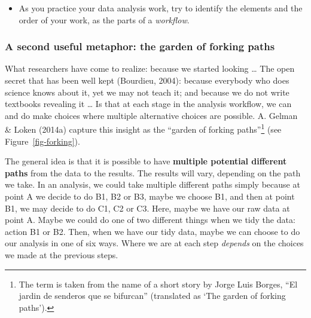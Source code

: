 \documentclass[
  letterpaper,
  DIV=11,
  numbers=noendperiod]{scrreprt}
\providecommand{\tightlist}{%
  \setlength{\itemsep}{0pt}\setlength{\parskip}{0pt}}\usepackage{longtable,booktabs,array}
\begin{document}
\begin{tcolorbox}[enhanced jigsaw, opacitybacktitle=0.6, title=\textcolor{quarto-callout-tip-color}{\faLightbulb}\hspace{0.5em}{Tip}, arc=.35mm, colbacktitle=quarto-callout-tip-color!10!white, colframe=quarto-callout-tip-color-frame, leftrule=.75mm, opacityback=0, breakable, titlerule=0mm, left=2mm, bottomrule=.15mm, toprule=.15mm, colback=white, coltitle=black, bottomtitle=1mm, toptitle=1mm, rightrule=.15mm]

\begin{itemize}
\tightlist
\item
  As you practice your data analysis work, try to identify the elements
  and the order of your work, as the parts of a \emph{workflow}.
\end{itemize}

\end{tcolorbox}

\hypertarget{sec-forking}{%
\subsubsection{A second useful metaphor: the garden of forking
paths}\label{sec-forking}}

What researchers have come to realize: because we started looking
\ldots{} The open secret that has been well kept (Bourdieu, 2004):
because everybody who does science knows about it, yet we may not teach
it; and because we do not write textbooks revealing it \ldots{} Is that
at each stage in the analysis workflow, we can and do make choices where
multiple alternative choices are possible. A. Gelman \& Loken (2014a)
capture this insight as the ``garden of forking paths''\footnote{The
  term is taken from the name of a short story by Jorge Luis Borges,
  ``El jardin de senderos que se bifurcan'' (translated as `The garden
  of forking paths').} (see Figure~\ref{fig-forking}).

The general idea is that it is possible to have \textbf{multiple
potential different paths} from the data to the results. The results
will vary, depending on the path we take. In an analysis, we could take
multiple different paths simply because at point A we decide to do B1,
B2 or B3, maybe we choose B1, and then at point B1, we may decide to do
C1, C2 or C3. Here, maybe we have our raw data at point A. Maybe we
could do one of two different things when we tidy the data: action B1 or
B2. Then, when we have our tidy data, maybe we can choose to do our
analysis in one of six ways. Where we are at each step \emph{depends} on
the choices we made at the previous steps.
\end{document}
